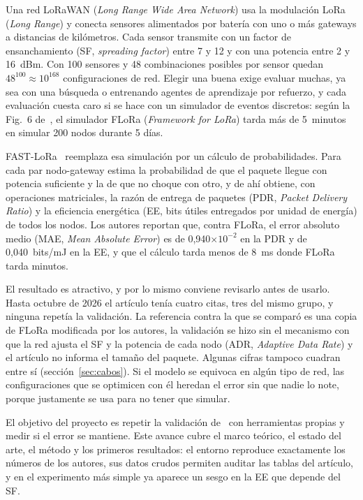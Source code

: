 \documentclass[conference,a4paper]{IEEEtran}
\begin{document}
Una red LoRaWAN (\emph{Long Range Wide Area Network}) usa la modulación LoRa (\emph{Long Range}) y conecta sensores alimentados por batería con uno o más gateways a distancias de kilómetros. Cada sensor transmite con un factor de ensanchamiento (SF, \emph{spreading factor}) entre 7 y 12 y con una potencia entre 2 y 16~dBm. Con 100 sensores y 48 combinaciones posibles por sensor quedan $48^{100}\approx10^{168}$ configuraciones de red. Elegir una buena exige evaluar muchas, ya sea con una búsqueda o entrenando agentes de aprendizaje por refuerzo, y cada evaluación cuesta caro si se hace con un simulador de eventos discretos: según la Fig.~6 de~\cite{fastlora}, el simulador FLoRa (\emph{Framework for LoRa}) tarda más de 5~minutos en simular 200 nodos durante 5 días.

FAST-LoRa~\cite{fastlora} reemplaza esa simulación por un cálculo de probabilidades. Para cada par nodo-gateway estima la probabilidad de que el paquete llegue con potencia suficiente y la de que no choque con otro, y de ahí obtiene, con operaciones matriciales, la razón de entrega de paquetes (PDR, \emph{Packet Delivery Ratio}) y la eficiencia energética (EE, bits útiles entregados por unidad de energía) de todos los nodos. Los autores reportan que, contra FLoRa, el error absoluto medio (MAE, \emph{Mean Absolute Error}) es de 0,940$\times10^{-2}$ en la PDR y de 0,040~bits/mJ en la EE, y que el cálculo tarda menos de 8~ms donde FLoRa tarda minutos.

El resultado es atractivo, y por lo mismo conviene revisarlo antes de usarlo. Hasta octubre de 2026 el artículo tenía cuatro citas, tres del mismo grupo, y ninguna repetía la validación. La referencia contra la que se comparó es una copia de FLoRa modificada por los autores, la validación se hizo sin el mecanismo con que la red ajusta el SF y la potencia de cada nodo (ADR, \emph{Adaptive Data Rate}) y el artículo no informa el tamaño del paquete. Algunas cifras tampoco cuadran entre sí (sección~\ref{sec:cabos}). Si el modelo se equivoca en algún tipo de red, las configuraciones que se optimicen con él heredan el error sin que nadie lo note, porque justamente se usa para no tener que simular.

El objetivo del proyecto es repetir la validación de~\cite{fastlora} con herramientas propias y medir si el error se mantiene. Este avance cubre el marco teórico, el estado del arte, el método y los primeros resultados: el entorno reproduce exactamente los números de los autores, sus datos crudos permiten auditar las tablas del artículo, y en el experimento más simple ya aparece un sesgo en la EE que depende del SF.
\end{document}
